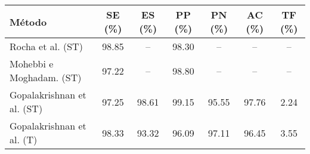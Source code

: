 \begin{tabular}{lcccccc}
    \toprule
    Método & SE (\%) & ES (\%) & PP (\%) & PN (\%) & AC (\%) & TF (\%)\\
    \midrule
    Rocha et al. (ST)          & 98.85 & --    & 98.30 & --    & --    & --  \\
    Mohebbi e Moghadam. (ST)   & 97.22 & --    & 98.80 & --    & --    & --  \\
    Gopalakrishnan et al. (ST) & 97.25 & 98.61 & 99.15 & 95.55 & 97.76 & 2.24\\
    Gopalakrishnan et al. (T)  & 98.33 & 93.32 & 96.09 & 97.11 & 96.45 & 3.55\\
    \bottomrule
\end{tabular}
